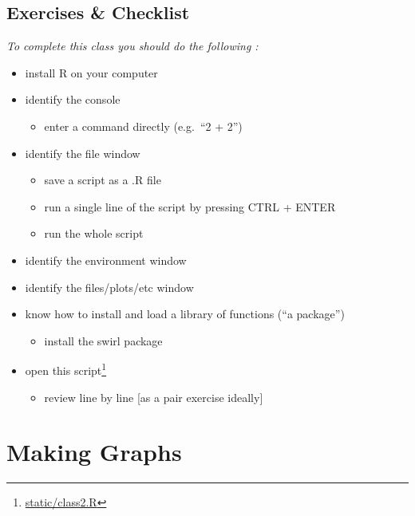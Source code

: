\documentclass[
  12pt,
  a5paper,
]{book}
\DeclareRobustCommand{\href}[2]{#2\footnote{\url{#1}}}
\providecommand{\tightlist}{%
  \setlength{\itemsep}{0pt}\setlength{\parskip}{0pt}}
\begin{document}
\hypertarget{exercises-checklist}{%
\section{Exercises \& Checklist}\label{exercises-checklist}}

\emph{To complete this class you should do the following :}

\begin{itemize}
\item
  install R on your computer
\item
  identify the console

  \begin{itemize}
  \tightlist
  \item
    enter a command directly (e.g.~``2 + 2'')
  \end{itemize}
\item
  identify the file window

  \begin{itemize}
  \tightlist
  \item
    save a script as a .R file
  \item
    run a single line of the script by pressing CTRL + ENTER
  \item
    run the whole script
  \end{itemize}
\item
  identify the environment window
\item
  identify the files/plots/etc window
\item
  know how to install and load a library of functions (``a package'')

  \begin{itemize}
  \tightlist
  \item
    install the swirl package
  \end{itemize}
\item
  open this \href{static/class2.R}{script}

  \begin{itemize}
  \tightlist
  \item
    review line by line {[}as a pair exercise ideally{]}
  \end{itemize}
\end{itemize}

\hypertarget{making-graphs}{%
\chapter{Making Graphs}\label{making-graphs}}
\end{document}
